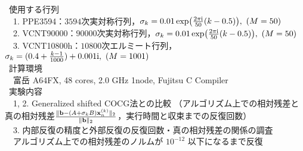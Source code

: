 

\textcolor{structure.fg}{\textbullet} \ 使用する行列\cite{ref-ELSES-matrix}\\
	　\textcolor{structure.fg}{1}. PPE3594：$3594$次実対称行列，$\sigma_k = 0.01 \exp(\frac{2 \pi \i}{50}(k-0.5)),\ (M=50)$\\
	　\textcolor{structure.fg}{2}. VCNT90000：$90000$次実対称行列，$\sigma_k = 0.01 \exp(\frac{2 \pi \i}{50}(k-0.5)),\ (M=50)$\\
	　\textcolor{structure.fg}{3}. VCNT10800h：$10800$次エルミート行列，$\sigma_k =(0.4+\frac{k-1}{1000}) + 0.001\i,\ (M=1001)$\\
\textcolor{structure.fg}{\textbullet} \ 計算環境\\
	　富岳 A64FX, 48 cores, 2.0 GHz 1node, Fujitsu C Compiler\\
\textcolor{structure.fg}{\textbullet} \ 実験内容\\
	　\textcolor{structure.fg}{1}, \textcolor{structure.fg}{2}. Generalized shifted COCG法との比較
	（アルゴリズム上での相対残差と真の相対残差$\frac{\|\vb{b}-(A+\sigma_{k}B)\vb{x}_{n}^{(k)}\|_2}{\|\vb{b}\|_2}$，実行時間と収束までの反復回数）\\
	　\textcolor{structure.fg}{3}. 内部反復の精度と外部反復の反復回数・真の相対残差の関係の調査\\
	　アルゴリズム上での相対残差のノルムが $10^{-12}$ 以下になるまで反復

%
%


\begin{comment}

\begin{itemize}
	\item 使用する行列\\
		1. VCNT90000：$90000$次実対称行列\\
		2. VCNT10800h：$10800$次エルミート行列
	\item 計算環境\\
		富岳 A64FX, 48 cores, 2.0 GHz 1node, Fujitsu C Compiler
	\item 実験内容\\
		1. Generalized shifted COCG法との比較（相対残差$\frac{\|\vb{b}-(A+\sigma_{k}B)\vb{x}_{n}^{(k)}\|_2}{\|\vb{b}\|_2}$，実行時間）\\
		2. 内部反復の精度と外部反復の反復回数・真の相対残差の関係の調査
\end{itemize}

\end{comment}

